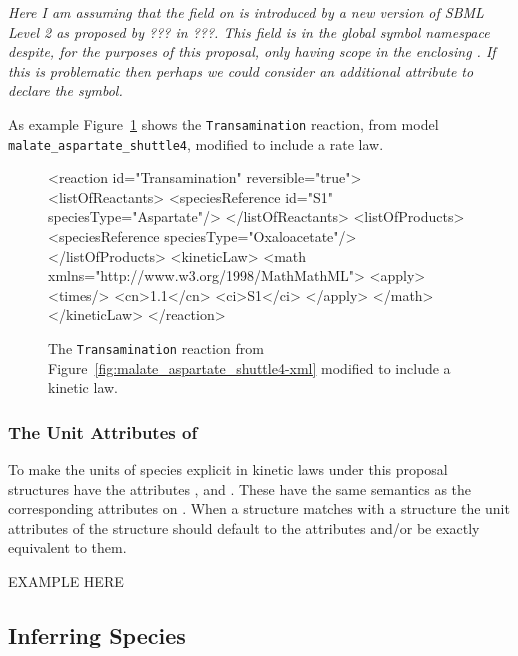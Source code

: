 \documentclass{cekarticle}
\begin{document}
\emph{Here I am assuming that the  field on  is introduced by a
new version of SBML Level 2 as proposed by ??? in ???. This  field is in the global symbol
namespace despite, for the purposes of this proposal, only having scope in the enclosing
.  If this is problematic then perhaps we could consider an additional attribute to
declare the symbol.}

As example Figure~\ref{fig:Transamination-xml} shows the \texttt{Transamination} reaction, from model
\texttt{malate\_aspartate\_shuttle4}, modified to include a rate law.

\begin{figure}[h]
\begin{example}
<reaction id="Transamination" reversible="true">
    <listOfReactants>
        <speciesReference id="S1" speciesType="Aspartate"/>
    </listOfReactants>
    <listOfProducts>
        <speciesReference speciesType="Oxaloacetate"/>
    </listOfProducts>
    <kineticLaw>
        <math xmlns="http://www.w3.org/1998/MathMathML">
            <apply>
                <times/>
                <cn>1.1</cn>
                <ci>S1</ci>
            </apply> 
        </math>
    </kineticLaw>
</reaction>
\end{example}
\caption{The \texttt{Transamination} reaction from
Figure~\ref{fig:malate_aspartate_shuttle4-xml} modified to include a kinetic law.} 
\label{fig:Transamination-xml}
\end{figure}

\subsubsection{The Unit Attributes of }

To make the units of species explicit in kinetic laws under this proposal 
 structures have the attributes ,
 and .  These have the same semantics as
the corresponding attributes on .  
When a  structure matches with a  structure
the unit attributes of the  structure should default to the
 attributes and/or be exactly equivalent to them.  

EXAMPLE HERE

\subsection{Inferring Species}
\end{document}

